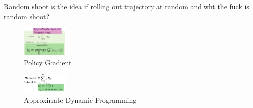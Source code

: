 \documentclass[journal]{IEEEtran}
\begin{document}
Random shoot is the idea if rolling out trajectory at random and wht the fuck is random shoot?















\begin{figure}[H]
    \centering
    \includegraphics[width=0.2\textwidth]{Control3.png}
    \caption{Policy Gradient}
    \label{fig:PC}
\end{figure}

\begin{figure}[H]
    \centering
    \includegraphics[width=0.2\textwidth]{Control4.png}
    \caption{Approximate Dynamic Programming}
    \label{fig:ADP}
\end{figure}








\end{document}
